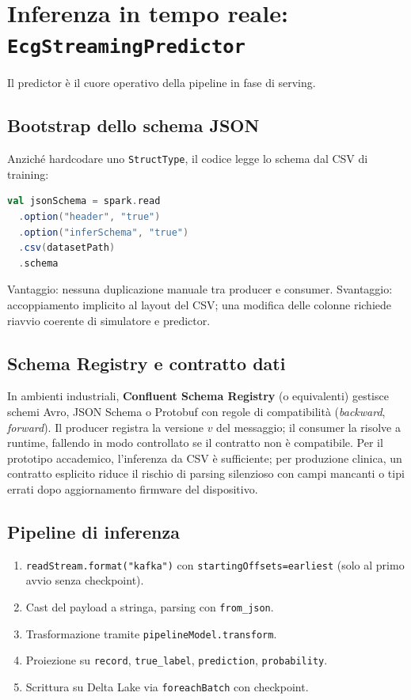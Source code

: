 \section{Inferenza in tempo reale: \texttt{EcgStreamingPredictor}}\label{sec:ecg-streaming-predictor}

Il predictor è il cuore operativo della pipeline in fase di serving.

\subsection{Bootstrap dello schema JSON}

Anziché hardcodare uno \texttt{StructType}, il codice legge lo schema dal CSV di training:

\begin{lstlisting}[language=Scala,caption={Inferenza schema da CSV per \texttt{from\_json}.},label={lst:schema-bootstrap}]
val jsonSchema = spark.read
  .option("header", "true")
  .option("inferSchema", "true")
  .csv(datasetPath)
  .schema
\end{lstlisting}

Vantaggio: nessuna duplicazione manuale tra producer e consumer.
Svantaggio: accoppiamento implicito al layout del CSV; una modifica delle colonne richiede riavvio coerente di simulatore e predictor.

\subsection{Schema Registry e contratto dati}\label{subsec:schema-registry}

In ambienti industriali, \textbf{Confluent Schema Registry} (o equivalenti) gestisce schemi Avro, JSON Schema o Protobuf con regole di compatibilità (\emph{backward}, \emph{forward}).
Il producer registra la versione $v$ del messaggio; il consumer la risolve a runtime, fallendo in modo controllato se il contratto non è compatibile.
Per il prototipo accademico, l'inferenza da CSV è sufficiente; per produzione clinica, un contratto esplicito riduce il rischio di parsing silenzioso con campi mancanti o tipi errati dopo aggiornamento firmware del dispositivo.

\subsection{Pipeline di inferenza}

\begin{enumerate}
  \item \texttt{readStream.format("kafka")} con \texttt{startingOffsets=earliest} (solo al primo avvio senza checkpoint).
  \item Cast del payload a stringa, parsing con \texttt{from\_json}.
  \item Trasformazione tramite \texttt{pipelineModel.transform}.
  \item Proiezione su \texttt{record}, \texttt{true\_label}, \texttt{prediction}, \texttt{probability}.
  \item Scrittura su Delta Lake via \texttt{foreachBatch} con checkpoint.
\end{enumerate}

